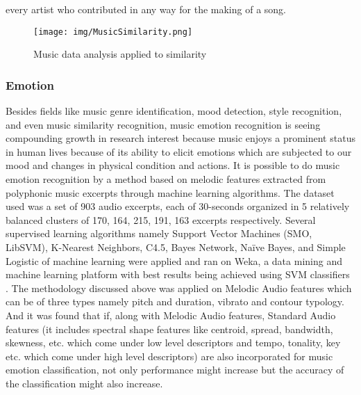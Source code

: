 \documentclass{proc}
\begin{document}
every artist who contributed in any way for the making of a song. \par    

\begin{figure}
	\centering
		\texttt{[image: img/MusicSimilarity.png]}
	\caption{Music data analysis applied to similarity }
	\label{fig:Music Similarity}
\end{figure}


\subsubsection{Emotion}
Besides fields like music genre identification, mood detection, style recognition, and even music similarity recognition, music emotion recognition is seeing compounding growth in research interest because music enjoys a prominent status in human lives because of its ability to elicit emotions which are subjected to our mood and changes in physical condition and actions. It is possible to do music emotion recognition by a method based on melodic features extracted from polyphonic music excerpts through machine learning algorithms. The dataset used was a set of 903 audio excerpts, each of 30-seconds organized in 5 relatively balanced clusters of 170, 164, 215, 191, 163 excerpts respectively. Several supervised learning algorithms namely Support Vector Machines (SMO, LibSVM), K-Nearest Neighbors, C4.5, Bayes Network, Naïve Bayes, and Simple Logistic of machine learning were applied and ran on Weka, a data mining and machine learning platform with best results being achieved using SVM classifiers \cite{Rocha2013}. The methodology discussed above was applied on Melodic Audio features which can be of three types namely pitch and duration, vibrato and contour typology. And it was found that if, along with Melodic Audio features, Standard Audio features (it includes spectral shape features like centroid, spread, bandwidth, skewness, etc. which come under low level descriptors and tempo, tonality, key etc. which come under high level descriptors) are also incorporated for music emotion classification, not only performance might increase but the accuracy of the classification might also increase.  
\end{document}
